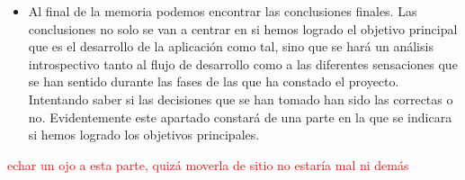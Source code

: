 \begin{itemize}
    \item Al final de la memoria podemos encontrar las conclusiones finales. Las conclusiones no solo se van a centrar en si hemos logrado el objetivo principal que es el desarrollo de la aplicación como tal, sino que se hará un análisis introspectivo tanto al flujo de desarrollo como a las diferentes sensaciones que se han sentido durante las fases de las que ha constado el proyecto. Intentando saber si las decisiones que se han tomado han sido las correctas o no. Evidentemente este apartado constará de una parte en la que se indicara si hemos logrado los objetivos principales. 
\end{itemize}

\textcolor{red}{echar un ojo a esta parte, quizá moverla de sitio no estaría mal ni demás}